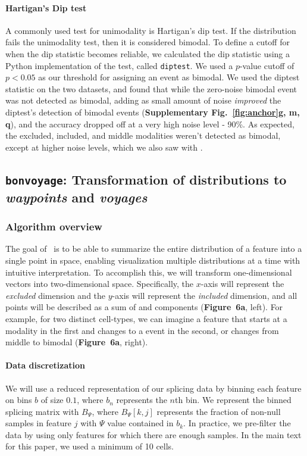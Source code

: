 \paragraph{Hartigan's Dip test} 
A commonly used test for unimodality is Hartigan's dip test\cite{Hartigan:1985ca}. If the distribution fails the unimodality test, then it is considered bimodal. To define a cutoff for when the dip statistic becomes reliable, we calculated the dip statistic using a Python implementation of the test, called \texttt{diptest}\cite{Anonymous:zTNIPlgQ}. We used a $p$-value cutoff of $p <0.05$ as our threshold for assigning an event as bimodal. We used the diptest statistic on the two datasets, and found that while the zero-noise bimodal event was not detected as bimodal, adding as small amount of noise \emph{improved} the diptest's detection of bimodal events (\textbf{Supplementary Fig.~\ref{fig:anchor}g, m, q}), and the accuracy dropped off at a very high noise level - 90\%. As expected, the excluded, included, and middle modalities weren't detected as bimodal, except at higher noise levels, which we also saw with \anchor.


\subsection{\texttt{bonvoyage}: Transformation of distributions to \emph{waypoints} and \emph{voyages}}
\label{sec:bonvoyage}

\subsubsection{Algorithm overview}

The goal of \bonvoyage\, is to be able to summarize the entire distribution of a feature into a single point in space, enabling visualization multiple distributions at a time with intuitive interpretation. To accomplish this, we will transform one-dimensional vectors into two-dimensional space. Specifically, the $x$-axis will represent the \emph{excluded} dimension and the $y$-axis will represent the \emph{included} dimension, and all points will be described as a sum of \0 and \1 components (\textbf{Figure~6a}, left). For example, for two distinct cell-types, we can imagine a feature that starts at a \1 modality in the first and changes to a \0 event in the second, or changes from middle to bimodal (\textbf{Figure~6a}, right). 



\paragraph{Data discretization}
We will use a reduced representation of our splicing data by binning each feature on bins $b$ of size $0.1$, where $b_n$ represents the $n$th bin. We represent the binned splicing matrix with $B_\Psi$, where $B_\Psi[k,j]$ represents the fraction of non-null samples in feature $j$ with $\Psi$ value contained in $b_k$. In practice, we pre-filter the data by using only features for which there are enough samples. In the main text for this paper, we used a minimum of 10 cells.

